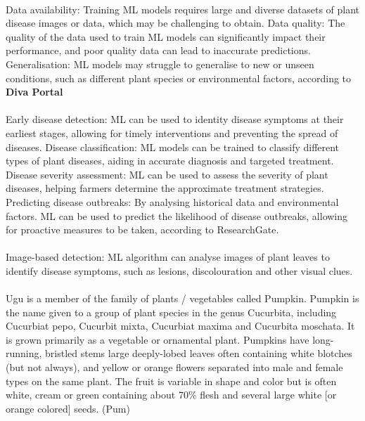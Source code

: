 \paragraph*{} Data availability: Training ML models requires large and diverse datasets of plant disease images or data, which may be challenging to obtain. Data quality: The quality of the data used to train ML models can significantly impact their performance, and poor quality data can lead to inaccurate predictions. Generalisation: ML models may struggle to generalise to new or unseen conditions, such as different plant species or environmental factors, according to {\bfseries Diva Portal}

\paragraph*{} 
Early disease detection: ML can be used to identity disease symptoms at their earliest stages, allowing for timely interventions and preventing the spread of diseases. Disease classification: ML models can be trained to classify different types of plant diseases, aiding in accurate diagnosis and targeted treatment. Disease severity assessment: ML can be used to assess the severity of plant diseases, helping farmers determine the approximate treatment strategies. Predicting disease outbreaks: By analysing historical data and environmental factors. ML can be used to predict the likelihood of disease outbreaks, allowing for proactive measures to be taken, according to ResearchGate.

\paragraph*{} Image-based detection: ML algorithm can analyse images of plant leaves to identify disease symptoms, such as lesions, discolouration and other visual clues.

\paragraph*{}Ugu is a member of the family of plants / vegetables called Pumpkin. Pumpkin is the name given to a group of plant species in the genus Cucurbita, including Cucurbiat pepo, Cucurbit mixta, Cucurbiat maxima and Cucurbita moschata. It is grown primarily as a vegetable or ornamental plant. Pumpkins have long-running, bristled stems large deeply-lobed leaves often containing white blotches (but not always), and yellow or orange flowers separated into male and female types on the same plant. The fruit is  variable in shape and color but is often white, cream or green containing about 70\% flesh and several large white [or orange colored] seeds. (Pum)

